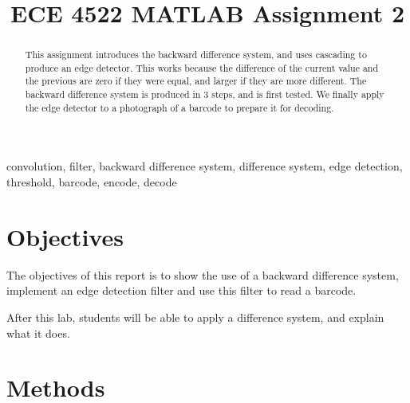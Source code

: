 \documentclass[conference]{../lib/IEEEtran}
\begin{document}
\title{ECE 4522 MATLAB Assignment 2}

\author{
}

\maketitle

\begin{abstract}
This assignment introduces the backward difference system, and uses cascading to produce an edge detector. This works because the difference of the current value and the previous are zero if they were equal, and larger if they are more different. The backward difference system is produced in 3 steps, and is first tested. We finally apply the edge detector to a photograph of a barcode to prepare it for decoding.
\end{abstract}

\begin{IEEEkeywords}
convolution, filter, backward difference system, difference system, edge detection, threshold, barcode, encode, decode
\end{IEEEkeywords}

\section{Objectives}

The objectives of this report is to show the use of a backward difference system, implement an edge detection filter and use this filter to read a barcode.

After this lab, students will be able to apply a difference system, and explain what it does.

\section{Methods}
\end{document}
